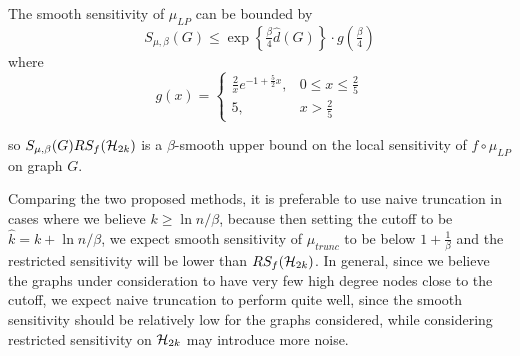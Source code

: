 \begin{proposition}
The smooth sensitivity of $\mu_{LP}$ can be bounded by
$$
S_{\mu, \beta}(G) \leq \exp\left\{\tfrac{\beta}{4} \hat{d}(G) \right\} \cdot g\left(\tfrac{\beta}{4}\right)
$$
where 
$$g(x) = \begin{cases}
\frac{2}{x} e^{-1 + \frac{5}{2} x}, & 0 \leq x \leq \frac{2}{5}\\
5, & x > \frac{2}{5}
\end{cases}$$ 
\end{proposition}
so $S_{\mu, \beta}(G) RS_f(\mathcal{H}_{2k})$ is a $\beta$-smooth upper bound on the local sensitivity of $f \circ \mu_{LP}$ on graph $G$.

Comparing the two proposed methods, it is preferable to use naive truncation in cases where we believe $k \geq \ln n/\beta$, because then setting the cutoff to be $\hat{k} = k + \ln n/\beta$, we expect smooth sensitivity of $\mu_{trunc}$ to be below $1 + \frac{1}{\beta}$ and the restricted sensitivity will be lower than $RS_f(\mathcal{H}_{2k})$. In general, since we believe the graphs under consideration to have very few high degree nodes close to the cutoff, we expect naive truncation to perform quite well, since the smooth sensitivity should be relatively low for the graphs considered, while considering restricted sensitivity on $\mathcal{H}_{2k}$ may introduce more noise.